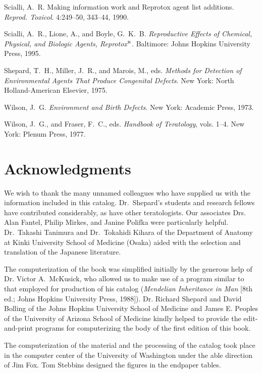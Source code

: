 \begin{references}
\item Scialli, A.~R. Making information work and Reprotox agent
list additions. {\it Reprod. Toxicol}. 4:249--50,
343--44, 1990.
\item Scialli, A.~R., Lione, A., and Boyle, G.~K.~B.
{\it Reproductive Effects of Chemical, Physical, and Biologic Agents,
Reprotox$^{\hbox{\tiny R}}$.} Baltimore: Johns Hopkins University Press, 1995.
\item Shepard, T.~H., Miller, J.~R., and Marois, M., eds.
{\it Methods for Detection of Environmental Agents
That Produce Congenital Defects}. New York:
North Holland-American Elsevier, 1975.
\item Wilson, J.~G. {\it Environment and Birth Defects}. New York:
Academic Press, 1973.
\item Wilson, J.~G., and Fraser, F.~C., eds. {\it Handbook of Teratology},
vols. 1--4. New York: Plenum Press,
 1977.
\end{references}


\clearemptydoublepage
\chapter{Acknowledgments}

We wish to thank the many unnamed colleagues who have supplied us
with the information included in this catalog. Dr.~Shepard's students
and research fellows have contributed considerably, as have other
teratologists. Our associates Drs. Alan Fantel, Philip Mirkes, and
Janine Polifka were particularly helpful. Dr.~Takashi Tanimura and 
Dr.~Tokahidi Kihara of
the Department of Anatomy at Kinki University School of Medicine
(Osaka) aided with the selection and translation of the Japanese
literature.

The computerization of the book was simplified initially by the
generous help of Dr. Victor A.~McKusick, who allowed us to make use
of a program similar to that employed for production of his catalog
({\it Mendelian Inheritance in Man} [8th ed.; Johns Hopkins
University Press, 1988]). Dr. Richard Shepard and David Bolling of
the Johns Hopkins University School of Medicine and James E.
Peoples of the University of Arizona School of Medicine kindly
helped to provide the edit-and-print programs for computerizing the
body of the first edition of this book.

The computerization of the material and the processing of the catalog
took place in the computer center of the University of Washington
under the able direction of Jim Fox.  Tom Stebbins designed the
figures in the endpaper tables.

